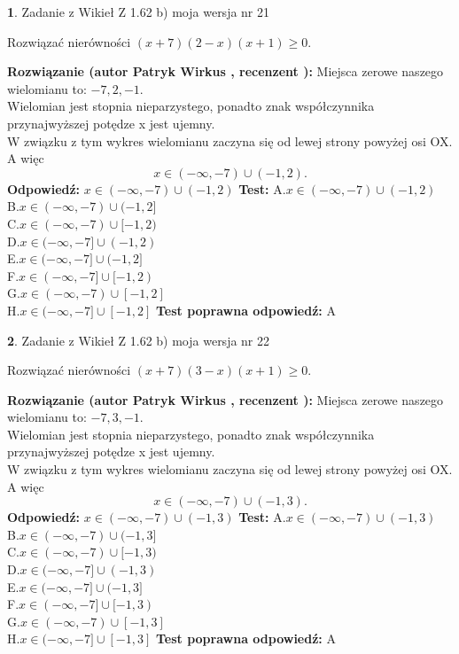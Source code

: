 \documentclass[12pt, a4paper]{article}
\theoremstyle{definition} %
\newtheorem{zad}{}
\newcommand{\zadStart}[1]{\begin{zad}#1\newline}
\newcommand{\zadStop}{\end{zad}}
\newcommand{\rozwStart}[2]{\noindent \textbf{Rozwiązanie (autor #1 , recenzent #2): }\newline}
\newcommand{\rozwStop}{\newline}
\newcommand{\odpStart}{\noindent \textbf{Odpowiedź:}\newline}
\newcommand{\odpStop}{\newline}
\newcommand{\testStart}{\noindent \textbf{Test:}\newline}
\newcommand{\testStop}{\newline}
\newcommand{\kluczStart}{\noindent \textbf{Test poprawna odpowiedź:}\newline}
\newcommand{\kluczStop}{\newline}
\begin{document}
\zadStart{Zadanie z Wikieł Z 1.62 b) moja wersja nr 21}

Rozwiązać nierówności $(x+7)(2-x)(x+1)\ge0$.
\zadStop
\rozwStart{Patryk Wirkus}{}
Miejsca zerowe naszego wielomianu to: $-7, 2, -1$.\\
Wielomian jest stopnia nieparzystego, ponadto znak współczynnika przy\linebreak najwyższej potędze x jest ujemny.\\ W związku z tym wykres wielomianu zaczyna się od lewej strony powyżej osi OX. A więc $$x \in (-\infty,-7) \cup (-1,2).$$
\rozwStop
\odpStart
$x \in (-\infty,-7) \cup (-1,2)$
\odpStop
\testStart
A.$x \in (-\infty,-7) \cup (-1,2)$\\
B.$x \in (-\infty,-7) \cup (-1,2]$\\
C.$x \in (-\infty,-7) \cup [-1,2)$\\
D.$x \in (-\infty,-7] \cup (-1,2)$\\
E.$x \in (-\infty,-7] \cup (-1,2]$\\
F.$x \in (-\infty,-7] \cup [-1,2)$\\
G.$x \in (-\infty,-7) \cup [-1,2]$\\
H.$x \in (-\infty,-7] \cup [-1,2]$
\testStop
\kluczStart
A
\kluczStop



\zadStart{Zadanie z Wikieł Z 1.62 b) moja wersja nr 22}

Rozwiązać nierówności $(x+7)(3-x)(x+1)\ge0$.
\zadStop
\rozwStart{Patryk Wirkus}{}
Miejsca zerowe naszego wielomianu to: $-7, 3, -1$.\\
Wielomian jest stopnia nieparzystego, ponadto znak współczynnika przy\linebreak najwyższej potędze x jest ujemny.\\ W związku z tym wykres wielomianu zaczyna się od lewej strony powyżej osi OX. A więc $$x \in (-\infty,-7) \cup (-1,3).$$
\rozwStop
\odpStart
$x \in (-\infty,-7) \cup (-1,3)$
\odpStop
\testStart
A.$x \in (-\infty,-7) \cup (-1,3)$\\
B.$x \in (-\infty,-7) \cup (-1,3]$\\
C.$x \in (-\infty,-7) \cup [-1,3)$\\
D.$x \in (-\infty,-7] \cup (-1,3)$\\
E.$x \in (-\infty,-7] \cup (-1,3]$\\
F.$x \in (-\infty,-7] \cup [-1,3)$\\
G.$x \in (-\infty,-7) \cup [-1,3]$\\
H.$x \in (-\infty,-7] \cup [-1,3]$
\testStop
\kluczStart
A
\kluczStop
\end{document}

